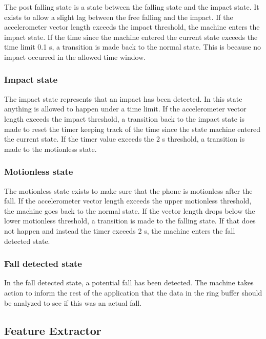 \documentclass[12pt, a4paper, onecolumn]{article}
\begin{document}
	The post falling state is a state between the falling state and the impact state. It exists to allow a slight lag between the free falling and the impact. If the accelerometer vector length exceeds the impact threshold, the machine enters the impact state. If the time since the machine entered the current state exceeds the time limit 0.1 s, a transition is made back to the normal state. This is because no impact occurred in the allowed time window.
	
	\subsubsection{Impact state}
	
	The impact state represents that an impact has been detected. In this state anything is allowed to happen under a time limit. If the accelerometer vector length exceeds the impact threshold, a transition back to the impact state is made to reset the timer keeping track of the time since the state machine entered the current state. If the timer value exceeds the 2 s threshold, a transition is made to the motionless state.
	
	\subsubsection{Motionless state}
	
	The motionless state exists to make sure that the phone is motionless after the fall. If the accelerometer vector length exceeds the upper motionless threshold, the machine goes back to the normal state. If the vector length drops below the lower motionless threshold, a transition is made to the falling state. If that does not happen and instead the timer exceeds 2 s, the machine enters the fall detected state.
	
	\subsubsection{Fall detected state}
	
	In the fall detected state, a potential fall has been detected. The machine takes action to inform the rest of the application that the data in the ring buffer should be analyzed to see if this was an actual fall.
	
	\subsection{Feature Extractor} \label{section:feature-extractor}
	
\end{document}
